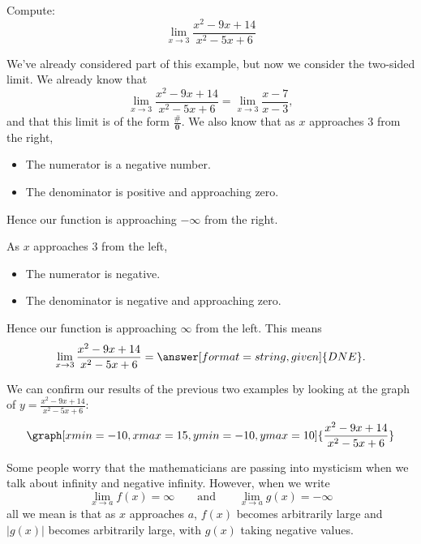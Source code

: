 \documentclass{ximera}
\begin{document}
\begin{example}
  Compute:
  \[
  \lim_{x\to 3} \frac{x^2-9x+14}{x^2-5x+6}
  \]
  \begin{explanation}
    We've already considered part of this example, but now we consider the two-sided limit. We already know that
    \[
    \lim_{x\to 3} \frac{x^2-9x+14}{x^2-5x+6} = \lim_{x\to
      3}\frac{x-7}{x-3},
    \]
    and that this limit is of the form $\boldsymbol{\tfrac{\#}{0}}$.
    We also know that as $x$ approaches $3$ from the right,
    \begin{itemize}
    \item The numerator is a negative number. 
    \item The denominator is positive and approaching zero.
    \end{itemize}
    Hence our function is approaching $-\infty$ from the right.
    
    As $x$ approaches $3$ from the left,
    \begin{itemize}
    \item The numerator is negative.
    \item The denominator is negative and approaching zero.
    \end{itemize}
    Hence our function is approaching $\infty$ from the left.
    This means
    \[
    \lim_{x\to 3} \frac{x^2-9x+14}{x^2-5x+6} = \answer[format=string,given]{DNE}.
    \]
    \begin{onlineOnly}
     We can confirm our results of the previous two examples by looking at the graph of $y=\frac{x^2-9x+14}{x^2-5x+6}$:
     \[
     \graph[xmin=-10,xmax=15,ymin=-10,ymax=10]{\frac{x^2-9x+14}{x^2-5x+6}}
     \]
   \end{onlineOnly}
  \end{explanation}
\end{example}

Some people worry that the mathematicians are passing into mysticism
when we talk about infinity and negative infinity. However, when we write
\[
\lim_{x\to a} f(x) = \infty \qquad\text{and}\qquad \lim_{x\to a} g(x) = -\infty
\]
all we mean is that as $x$ approaches $a$, $f(x)$ becomes arbitrarily
large and $|g(x)|$ becomes arbitrarily large, with $g(x)$ taking
negative values.
\end{document}

